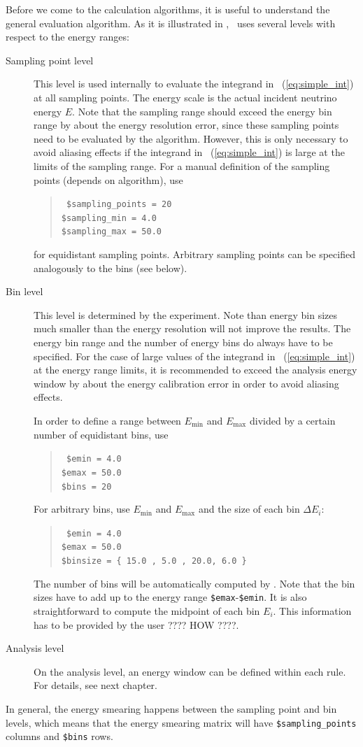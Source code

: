 Before we come to the calculation algorithms, it is useful to understand
the general evaluation algorithm. As it is illustrated in , 
\GLOBES\ uses several levels with respect to the energy ranges:
\begin{description}
\item[Sampling point level]
 This level is used internally to evaluate the integrand in \eq~(\ref{eq:simple_int}) at all sampling points. The energy scale is the actual incident neutrino energy $E$. Note that the sampling range should exceed the energy bin range by about the energy resolution error, since these sampling points need to be evaluated by the algorithm. However, this is only
necessary to avoid aliasing effects if the integrand in \eq~(\ref{eq:simple_int}) is large at the limits of the sampling range.
For a manual definition of the sampling points (depends on algorithm), use
\begin{quote}
{\tt
\$sampling\_points = 20\\
\$sampling\_min =          4.0\\
\$sampling\_max =         50.0
}
\end{quote}
for equidistant sampling points. Arbitrary sampling points can be specified analogously to the bins (see below).
\item[Bin level] This level is determined by the experiment. Note than energy
bin sizes much smaller than the energy resolution will not improve the results. The energy bin range and the number of energy bins do always have to be specified. For the case of large values of the integrand in \eq~(\ref{eq:simple_int}) at the energy range limits, it is recommended to exceed the analysis energy window by about the energy calibration error in order to avoid aliasing effects.

In order to define a range between $E_\mathrm{min}$
and $E_\mathrm{max}$ divided by a certain number of equidistant bins,
use
\begin{quote}
{\tt
\$emin = 4.0\\
\$emax = 50.0\\
\$bins = 20
}
\end{quote}
For arbitrary bins, use $E_\mathrm{min}$
and $E_\mathrm{max}$ and the size of each bin  $\Delta E_i$:
\begin{quote}
{\tt
\$emin = 4.0\\
\$emax = 50.0\\
\$binsize = \{  15.0 , 5.0 , 20.0, 6.0 \} 
}
\end{quote}
The number of bins will be automatically computed by \GLOBES . Note that the
bin sizes have to add up to the energy range {\tt \$emax}-{\tt \$emin}.
%
It is also
straightforward to compute the midpoint of each bin $E_i$. This information
has to be provided by the user ???? HOW ????. 
\item[Analysis level]
On the analysis level, an energy window can be defined within each rule. For
details, see next chapter.
\end{description}
In general, the energy smearing happens between the sampling point and bin levels, which means that the energy smearing matrix will have {\tt \$sampling\_points} columns and {\tt \$bins} rows. 

